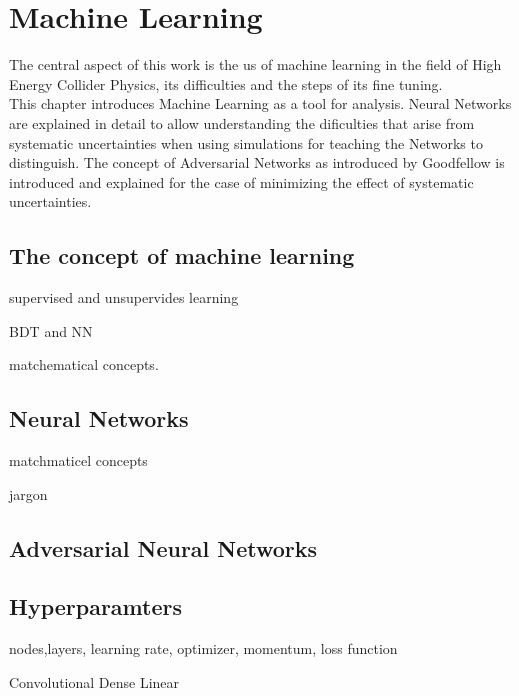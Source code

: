 \section{Machine Learning}

The central aspect of this work is the us of machine learning in the field of High Energy Collider Physics, its difficulties and the steps of its fine tuning.\\
This chapter introduces Machine Learning as a tool for analysis. Neural Networks are explained in detail to allow understanding the dificulties that arise from systematic uncertainties when using simulations for teaching the Networks to distinguish.
The concept of Adversarial Networks as introduced by Goodfellow is introduced and explained for the case of minimizing the effect of systematic uncertainties.

\subsection{The concept of machine learning}

supervised and unsupervides learning

BDT and NN

matchematical concepts.

\subsection{Neural Networks}

matchmaticel concepts

jargon

\subsection{Adversarial Neural Networks}

\subsection{Hyperparamters}

nodes,layers, learning rate, optimizer, momentum, loss function

Convolutional Dense Linear

